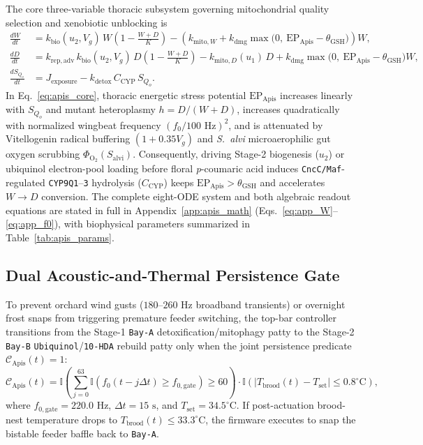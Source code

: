 \documentclass[11pt]{article}
\begin{document}
The core three-variable thoracic subsystem governing mitochondrial quality selection and xenobiotic unblocking is
\begin{align}
  \frac{dW}{dt} &= k_{\mathrm{bio}}(u_2, V_g)\,W\left(1 - \frac{W+D}{K}\right) - \left(k_{\mathrm{mito},W} + k_{\mathrm{dmg}}\max\!\big(0,\ \mathrm{EP}_{\mathrm{Apis}} - \theta_{\mathrm{GSH}}\big)\right)W, \nonumber\\
  \frac{dD}{dt} &= k_{\mathrm{rep,adv}}\,k_{\mathrm{bio}}(u_2, V_g)\,D\left(1 - \frac{W+D}{K}\right) - k_{\mathrm{mito},D}(u_1)\,D + k_{\mathrm{dmg}}\max\!\big(0,\ \mathrm{EP}_{\mathrm{Apis}} - \theta_{\mathrm{GSH}}\big)W, \label{eq:apis_core}\\
  \frac{dS_{Q_o}}{dt} &= J_{\mathrm{exposure}} - k_{\mathrm{detox}}\,C_{\mathrm{CYP}}\,S_{Q_o}. \nonumber
\end{align}
In Eq.~\eqref{eq:apis_core}, thoracic energetic stress potential $\mathrm{EP}_{\mathrm{Apis}}$ increases linearly with $S_{Q_o}$ and mutant heteroplasmy $h = D / (W + D)$, increases quadratically with normalized wingbeat frequency $(f_0 / 100\text{ Hz})^2$, and is attenuated by Vitellogenin radical buffering $(1 + 0.35 V_g)$ and \textit{S.\ alvi} microaerophilic gut oxygen scrubbing $\Phi_{\mathrm{O}_2}(S_{\mathrm{alvi}})$. Consequently, driving Stage-2 biogenesis ($u_2$) or ubiquinol electron-pool loading before floral \textit{p}-coumaric acid induces \texttt{CncC/Maf}-regulated \texttt{CYP9Q1}--\texttt{3} hydrolysis ($C_{\mathrm{CYP}}$) keeps $\mathrm{EP}_{\mathrm{Apis}} > \theta_{\mathrm{GSH}}$ and accelerates $W \to D$ conversion. The complete eight-ODE system and both algebraic readout equations are stated in full in Appendix~\ref{app:apis_math} (Eqs.~\eqref{eq:app_W}--\eqref{eq:app_f0}), with biophysical parameters summarized in Table~\ref{tab:apis_params}.

\subsection{Dual Acoustic-and-Thermal Persistence Gate}
To prevent orchard wind gusts ($180\text{--}260\text{ Hz}$ broadband transients) or overnight frost snaps from triggering premature feeder switching, the top-bar controller transitions from the Stage-1 \texttt{Bay-A} detoxification/mitophagy patty to the Stage-2 \texttt{Bay-B} \texttt{Ubiquinol}/\texttt{10-HDA} rebuild patty only when the joint persistence predicate $\mathcal{C}_{\mathrm{Apis}}(t) = 1$:
\begin{equation}
  \mathcal{C}_{\mathrm{Apis}}(t) = \mathbb{I}\!\left(\sum_{j=0}^{63} \mathbb{I}\!\left(f_0(t - j\Delta t) \ge f_{0,\mathrm{gate}}\right) \ge 60\right) \cdot \mathbb{I}\!\left(\big|T_{\mathrm{brood}}(t) - T_{\mathrm{set}}\big| \le 0.8^\circ\mathrm{C}\right),
  \label{eq:apis_gate}
\end{equation}
where $f_{0,\mathrm{gate}} = 220.0\text{ Hz}$, $\Delta t = 15\text{ s}$, and $T_{\mathrm{set}} = 34.5^\circ\mathrm{C}$. If post-actuation brood-nest temperature drops to $T_{\mathrm{brood}}(t) \le 33.3^\circ\mathrm{C}$, the firmware executes  to snap the bistable feeder baffle back to \texttt{Bay-A}.
\end{document}
